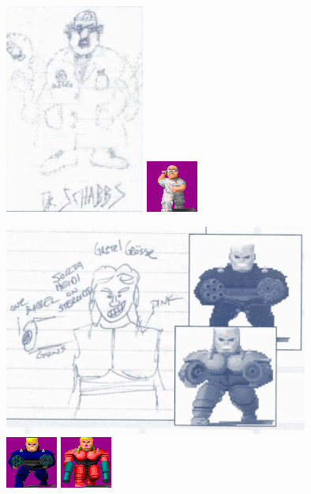 \documentclass[book.tex]{subfiles}
\begin{document}
   \begin{figure}[H]
\centering
 \includegraphics[scale=1]{imgs/tom_hall_sketch_dr_schabbs.png}
   \includegraphics[scale=10]{imgs/sprites/schabbs.png}
 \end{figure}
 
   \begin{figure}[H]
\centering
 \includegraphics[scale=0.8]{imgs/tom_hall_sketch_gretel.png}\\
 \includegraphics[scale=2.5]{imgs/sprites/hans_grosse.png}
 \includegraphics[scale=5]{imgs/sprites/gretel_hanse.png}
 \end{figure}
 
\end{document}
